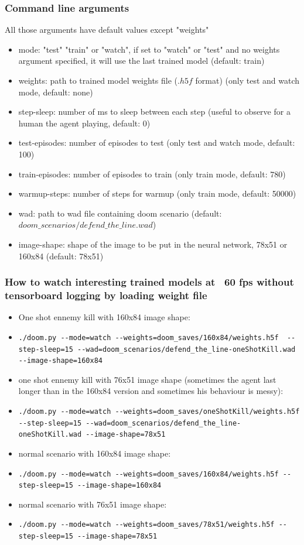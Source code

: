 \documentclass[a4paper,10pt,openany,oneside]{report}
\begin{document}
\subsubsection*{Command line arguments}
\raggedright
All those arguments have default values except "weights"
\begin{itemize}
\item mode: "test" "train" or "watch", if set to "watch" or "test" and no weights argument specified, it will use the last trained model (default: train)
\item weights: path to trained model weights file ($.h5f$ format) (only test and watch mode, default: none)
\item step-sleep: number of ms to sleep between each step (useful to observe for a human the agent playing, default: 0)
\item test-episodes: number of episodes to test (only test and watch mode, default: 100)
\item train-episodes: number of episodes to train (only train mode, default: 780)
\item warmup-steps: number of steps for warmup (only train mode, default: 50000)
\item wad: path to wad file containing doom scenario (default: $doom\_scenarios/defend\_the\_line.wad$)
\item image-shape: shape of the image to be put in the neural network, 78x51 or 160x84 (default: 78x51)
\end{itemize}
\subsubsection*{How to watch interesting trained models at ~60 fps without tensorboard logging by loading weight file}
\begin{itemize}
	\item One shot ennemy kill with 160x84 image shape: 
	\item \lstinline{./doom.py --mode=watch --weights=doom_saves/160x84/weights.h5f  --step-sleep=15 --wad=doom_scenarios/defend_the_line-oneShotKill.wad --image-shape=160x84}
	\item one shot ennemy kill with 76x51 image shape (sometimes the agent last longer than in the 160x84 version and sometimes his behaviour is messy): 
	\item \lstinline{./doom.py --mode=watch --weights=doom_saves/oneShotKill/weights.h5f --step-sleep=15 --wad=doom_scenarios/defend_the_line-oneShotKill.wad --image-shape=78x51}
	\item normal scenario with 160x84 image shape: 
	\item \lstinline{./doom.py --mode=watch --weights=doom_saves/160x84/weights.h5f --step-sleep=15 --image-shape=160x84}
	\item normal scenario with 76x51 image shape: 
	\item \lstinline{./doom.py --mode=watch --weights=doom_saves/78x51/weights.h5f --step-sleep=15 --image-shape=78x51}
\end{itemize}
\end{document}
